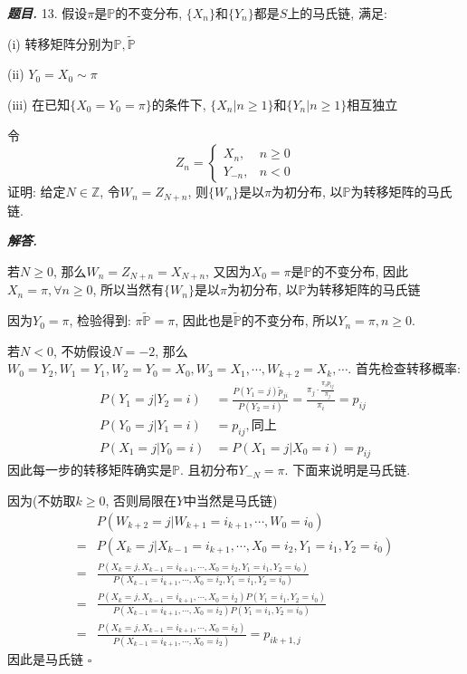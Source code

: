 \documentclass[10pt, a4paper, oneside]{ctexart}
\newenvironment{problem}{\begin{framed}\par\noindent\textbf{\textit{题目. }}}{\end{framed}\par}
\newenvironment{solution}{%
  \par\noindent\textbf{\textit{解答. }}\ignorespaces
}{%
  \hfill\ensuremath{\square}\par %
}
\begin{document}
        \begin{problem}
            13. 假设$\pi$是$\mathbb{P}$的不变分布, $\{X_n\}$和$\{Y_n\}$都是$S$上的马氏链, 满足:
        
            (i) 转移矩阵分别为$\mathbb{P},\mathbb{\tilde{P}}$
        
            (ii) $Y_0=X_0\sim \pi$
        
            (iii) 在已知$\{X_0=Y_0=\pi\}$的条件下, $\{X_n|n\geq 1\}$和$\{Y_n|n\geq 1\}$相互独立
        
            令
            $$Z_n=\begin{cases}
                X_n,&n\geq 0\\
                Y_{-n},&n<0
            \end{cases}$$
            证明: 给定$N\in\mathbb{Z}$, 令$W_n=Z_{N+n}$, 则$\{W_n\}$是以$\pi$为初分布, 以$\mathbb{P}$为转移矩阵的马氏链.
        \end{problem}
        \begin{solution}
        若$N\geq 0$, 那么$W_n=Z_{N+n}=X_{N+n}$, 又因为$X_0=\pi$是$\mathbb{{P}}$的不变分布, 因此$X_n=\pi, \forall n\geq 0$, 所以当然有$\{W_n\}$是以$\pi$为初分布, 以$\mathbb{P}$为转移矩阵的马氏链
        
        因为$Y_0=\pi$, 检验得到: $\pi \tilde{\mathbb{P}}=\pi$, 因此也是$\tilde{\mathbb{P}}$的不变分布, 所以$Y_n=\pi, n\geq 0$.
        
        若$N<0$, 不妨假设$N=-2$, 那么$W_0=Y_2, W_1=Y_1, W_2=Y_0=X_0, W_3=X_1, \cdots, W_{k+2}=X_{k},\cdots$. 首先检查转移概率: 
        \begin{align*}
            P(Y_1=j|Y_2=i)&=\frac{P(Y_1=j)\tilde{p}_{ji}}{P(Y_2=i)}=\frac{\pi_j \cdot \frac{\pi_i p_{ij}}{\pi_j}}{\pi_i}=p_{ij}\\
            P(Y_0=j|Y_1=i)&=p_{ij}, \text{同上}\\
            P(X_1=j|Y_0=i)&=P(X_1=j|X_0=i)=p_{ij}
        \end{align*}
        因此每一步的转移矩阵确实是$\mathbb{{P}}$. 且初分布$Y_{-N}=\pi$. 下面来说明是马氏链.
        
        因为(不妨取$k\geq 0$, 否则局限在$Y$中当然是马氏链)
        \begin{align*}
            &P(W_{k+2}=j|W_{k+1}=i_{k+1},\cdots,W_{0}=i_0)\\
            =&P(X_{k}=j|X_{k-1}=i_{k+1},\cdots,X_0=i_2,Y_1=i_1,Y_{2}=i_0)\\
            =&\frac{P(X_{k}=j,X_{k-1}=i_{k+1},\cdots,X_0=i_2,Y_1=i_1,Y_{2}=i_0)}{P(X_{k-1}=i_{k+1},\cdots,X_0=i_2,Y_1=i_1,Y_{2}=i_0)}\\
            =&\frac{P(X_{k}=j,X_{k-1}=i_{k+1},\cdots,X_0=i_2)P(Y_1=i_1,Y_{2}=i_0)}{P(X_{k-1}=i_{k+1},\cdots,X_0=i_2)P(Y_1=i_1,Y_{2}=i_0)}\\
            =&\frac{P(X_{k}=j,X_{k-1}=i_{k+1},\cdots,X_0=i_2)}{P(X_{k-1}=i_{k+1},\cdots,X_0=i_2)}=p_{i{k+1},j}
        \end{align*}
        因此是马氏链
        \end{solution}
\end{document}
